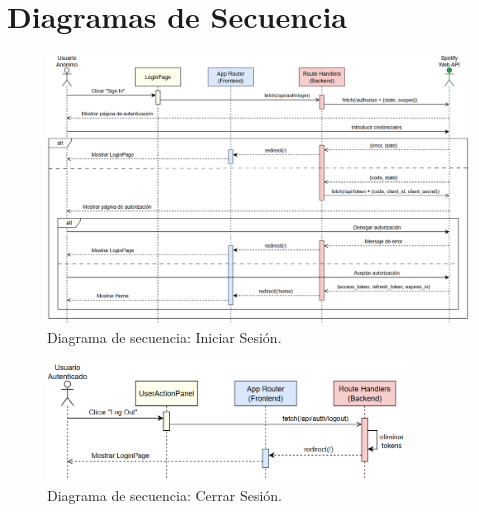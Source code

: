 \section{Diagramas de Secuencia}

\begin{figure}[H]
    \centering
    \includegraphics[width=\textwidth]{figures/diagramas_secuencia/ds_iniciar_sesion.png}
    \caption{Diagrama de secuencia: Iniciar Sesión.}
    \label{fig:ds_iniciar_sesion}
\end{figure}

\begin{figure}[H]
    \centering
    \includegraphics[width=0.85\textwidth]{figures/diagramas_secuencia/ds_cerrar_sesion.png}
    \caption{Diagrama de secuencia: Cerrar Sesión.}
    \label{fig:ds_cerrar_sesion}
\end{figure}

